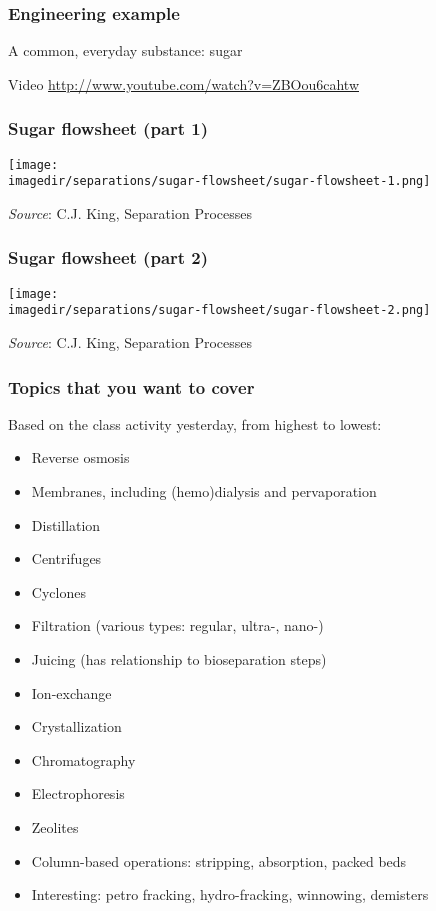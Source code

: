 \begin{frame}\frametitle{Engineering example}
	A common, everyday substance: sugar 
	
	\vspace{36pt}
	Video \href{http://www.youtube.com/watch?v=ZBOou6cahtw}{http://www.youtube.com/watch?v=ZBOou6cahtw}	
\end{frame}

\begin{frame}\frametitle{Sugar flowsheet (part 1)}
	\begin{center}
		\texttt{[image: \\imagedir/separations/sugar-flowsheet/sugar-flowsheet-1.png]}
	\end{center}
	\emph{Source}: C.J. King, Separation Processes
\end{frame}

\begin{frame}\frametitle{Sugar flowsheet (part 2)}
	\begin{center}
		\texttt{[image: \\imagedir/separations/sugar-flowsheet/sugar-flowsheet-2.png]}
	\end{center}
	\emph{Source}: C.J. King, Separation Processes
\end{frame}

\begin{frame}\frametitle{Topics that you want to cover}
	Based on the class activity yesterday, from highest to lowest:
	\begin{itemize}
		\item	Reverse osmosis
		\item	Membranes, including (hemo)dialysis and pervaporation
		\item	Distillation
		\item	Centrifuges
		\item	Cyclones
		\item	Filtration (various types: regular, ultra-, nano-)
		\item	Juicing (has relationship to bioseparation steps)
		\item	Ion-exchange
		\item	Crystallization
		\item	Chromatography
		\item	Electrophoresis
		\item	Zeolites
		\item	Column-based operations: stripping, absorption, packed beds
		\item	Interesting: petro fracking, hydro-fracking, winnowing, demisters 
	\end{itemize}
\end{frame}

